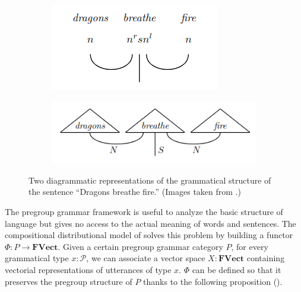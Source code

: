 \documentclass[11pt,a4paper,openright,twoside]{report}
\theoremstyle{plain}
\theoremstyle{definition}
\newcommand\dblquote[1]{\textquotedblleft #1\textquotedblright}
\begin{document}
\begin{figure}[h]
  \begin{center}
    \begin{subfigure}{0.32\textwidth}
      \includegraphics[width=\textwidth]{figures/pregroup1.png}
      \caption{}
    \end{subfigure}
    \begin{subfigure}{0.47\textwidth}
      \includegraphics[width=\textwidth]{figures/pregroup2.png}
      \caption{}
    \end{subfigure}         
    \caption[Pregroup representation of grammar]{Two diagrammatic representations of the grammatical structure of the sentence \dblquote{Dragons breathe fire.} (Images taken from \cite{lewis2019compositionality}.)}
    \label{fig: pregroup}
  \end{center}
\end{figure}

The pregroup grammar framework is useful to analyze the basic structure of language but gives no access to the actual meaning of words and sentences. The compositional distributional model of \cite{coecke2010mathematical} solves this problem by building a functor $\Phi: P \to  \mathbf{FVect}$. Given a certain pregroup grammar category $P$, for every grammatical type $x: \mathcal{P}$, we can associate a vector space $X:\mathbf{FVect}$ containing vectorial representations of utterances of type $x$. $\Phi$ can be defined so that it preserves the pregroup structure of $P$ thanks to the following proposition (\cite{coecke2010mathematical}).
\end{document}
